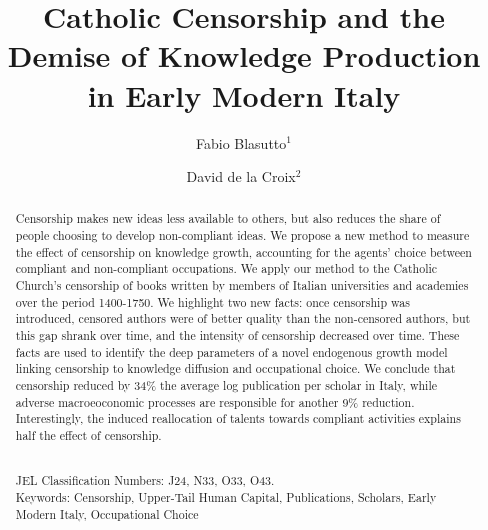 \documentclass[12pt]{article}
\title{Catholic Censorship and the Demise of Knowledge Production in Early Modern Italy}
\author{Fabio Blasutto$^1$ \and David de la Croix$^2$}
\begin{document}
\maketitle


\begin{abstract}
Censorship makes new ideas less available to others, but also reduces the share of people choosing to develop non-compliant ideas.
We propose a new method to measure the effect of censorship on knowledge growth,  accounting for the agents' choice between compliant and non-compliant occupations. We apply our method to the Catholic Church's censorship of books written by members of Italian universities and academies over the period 1400-1750. We highlight two new facts: once censorship was introduced, censored authors were of better quality than the non-censored authors, but this gap shrank over time, and the intensity of censorship decreased over time. These facts are used to identify the deep parameters of a novel endogenous growth model linking censorship to knowledge diffusion and occupational choice. We conclude that censorship reduced by 34\% the average log publication per scholar in Italy, while adverse macroeoconomic processes are responsible for another 9\% reduction. Interestingly, the induced reallocation of talents towards compliant activities explains half the effect of censorship.

\mbox{ }\\
JEL Classification Numbers: J24, N33, O33, O43. \\
Keywords: Censorship, Upper-Tail Human Capital, Publications, Scholars, Early Modern Italy, Occupational Choice
\end{abstract}


\thispagestyle{empty}
\newpage
\onehalfspacing







\clearpage

\onehalfspacing



\renewcommand\thefigure{\thesection.\arabic{figure}}
\renewcommand\thetable{\thesection.\arabic{table}}


\appendix




\clearpage



\end{document}
